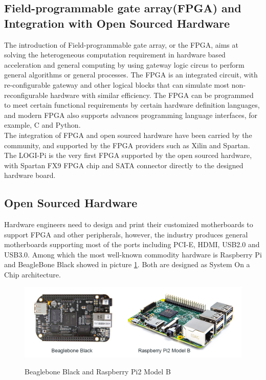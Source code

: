 \documentclass[11pt,openright,a4paper]{report}
\begin{document}
\subsection{Field-programmable gate array(FPGA) and Integration with Open Sourced Hardware}
The introduction of Field-programmable gate array, or the FPGA, aims at solving the heterogeneous computation requirement in hardware based acceleration and general computing by using gateway logic circus to perform general algorithms or general processes\cite{hauck2010reconfigurable}. The FPGA is an integrated circuit, with re-configurable gateway and other logical blocks that can simulate most non-reconfigurable hardware with similar efficiency. The FPGA can be programmed to meet certain functional requirements by certain hardware definition languages, and modern FPGA also supports advances programming language interfaces, for example, C and Python.\\
The integration of FPGA and open sourced hardware have been carried by the community, and supported by the FPGA providers such as Xilin and Spartan. The LOGI-Pi is the very first FPGA supported by the open sourced hardware, with Spartan FX9 FPGA chip and SATA connector directly to the designed hardware board\cite{logipi}.
\subsection{Open Sourced Hardware}
Hardware engineers need to design and print their customized motherboards to support FPGA and other peripherals, however, the industry produces general motherboards supporting most of the ports including PCI-E, HDMI, USB2.0 and USB3.0. Among which the most well-known commodity hardware is Raspberry Pi and BeagleBone Black showed in picture \ref{fig:commodityhardware}. Both are designed as System On a Chip architecture.\\ 
\begin{figure}[H]
\centering
\includegraphics[width=0.7\linewidth]{picture/commodityhardware.jpg}
\caption{Beaglebone Black and Raspberry Pi2 Model B}\cite{bbbrpi}
\label{fig:commodityhardware}
\end{figure}
\end{document}
